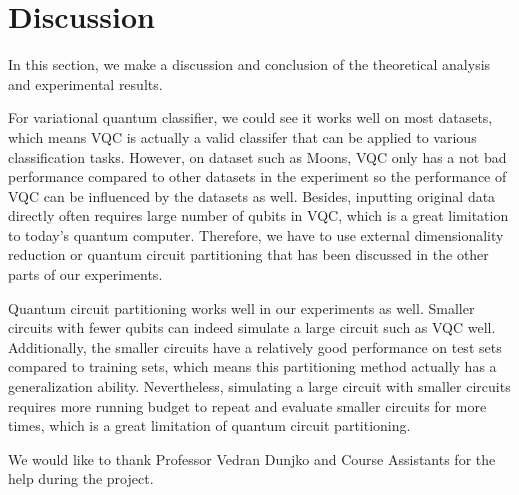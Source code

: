 \documentclass[sigconf]{acmart}
\begin{document}

\section{Discussion}
In this section, we make a discussion and conclusion of the theoretical analysis and experimental results.

For variational quantum classifier, we could see it works well on most datasets, which means VQC is actually a valid classifer that can be applied to various classification tasks. However, on dataset such as Moons, VQC only has a not bad performance compared to other datasets in the experiment so the performance of VQC can be influenced by the datasets as well. Besides, inputting original data directly often requires large number of qubits in VQC, which is a great limitation to today's quantum computer. Therefore, we have to use external dimensionality reduction or quantum circuit partitioning that has been discussed in the other parts of our experiments.

Quantum circuit partitioning works well in our experiments as well. Smaller circuits with fewer qubits can indeed simulate a large circuit such as VQC well. Additionally, the smaller circuits have a relatively good performance on test sets compared to training sets, which means this partitioning method actually has a generalization ability. Nevertheless, simulating a large circuit with smaller circuits requires more running budget to repeat and evaluate smaller circuits for more times, which is a great limitation of quantum circuit partitioning. 

\begin{acks}
We would like to thank Professor Vedran Dunjko and Course Assistants for the help during the project.
\end{acks}




\end{document}
